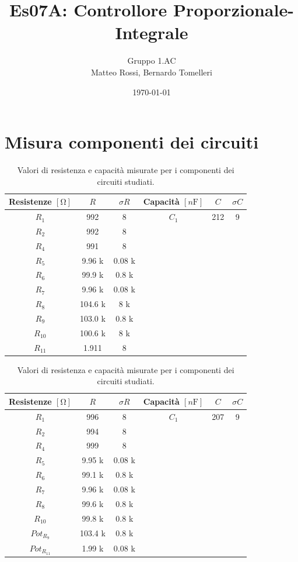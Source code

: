 \documentclass[10pt, a4paper, italian]{article}
\author{Gruppo 1.AC \\ Matteo Rossi, Bernardo Tomelleri}
\title{Es07A: Controllore Proporzionale-Integrale}
\begin{document}
\date{\today}
\maketitle

\setcounter{section}{0}

\section*{Misura componenti dei circuiti}
\begin{table}[htbp]
\centering
\begin{tabular}{cccccc}
\toprule
Resistenze $[\si{\ohm}]$ & $R$ & $\sigma R$ & Capacità $[\si{n\F}]$ & $C$ &
$\sigma C$ \\
\midrule
\midrule
$R_1$	  	& 992 	& 8		& $C_1$ & 212	& 9 \\
$R_2$	  	& 992	& 8		& & & \\
$R_4$	  	& 991	& 8		& & & \\
$R_5$	  	& 9.96 k	& 0.08	k& & & \\
$R_6$	  	& 99.9 k	& 0.8	k& & & \\
$R_7$	  	& 9.96 k& 0.08	k	& & & \\
$R_8$	  	& 104.6	k& 8		k& & & \\
$R_9$	  	& 103.0	k& 0.8	k	& & & \\
$R_{10}$  	& 100.6	k& 8		k& & & \\
$R_{11}$  	& 1.911	& 8		& & & \\
\bottomrule     
\end{tabular}
\caption{Valori di resistenza e capacità misurate per i componenti dei
circuiti studiati. \label{tab: rcmes_B}}

\begin{tabular}{cccccc}
\toprule
Resistenze $[\si{\ohm}]$ & $R$ & $\sigma R$ & Capacità $[\si{n\F}]$ & $C$ &
$\sigma C$ \\
\midrule
\midrule
$R_1$	  	& 996 	& 8		& $C_1$ & 207	& 9 \\
$R_2$	  	& 994	& 8		& & & \\
$R_4$	  	& 999	& 8		& & & \\
$R_5$	  	& 9.95	k& 0.08	k& & & \\
$R_6$	  	& 99.1	k& 0.8	k& & & \\
$R_7$	  	& 9.96	k& 0.08		k& & & \\
$R_8$	  	& 99.6	k& 0.8		k& & & \\
$R_{10}$  	& 99.8	k& 0.8		k& & & \\
$Pot_{R_9}$ & 103.4 k & 0.8 k& & & \\
$Pot_{R_{11}}$ & 1.99 k & 0.08 k& & &\\
\bottomrule   
\end{tabular}
\caption{Valori di resistenza e capacità misurate per i componenti dei
circuiti studiati. \label{tab: rcmes_M}}
\end{table}
\end{document}
